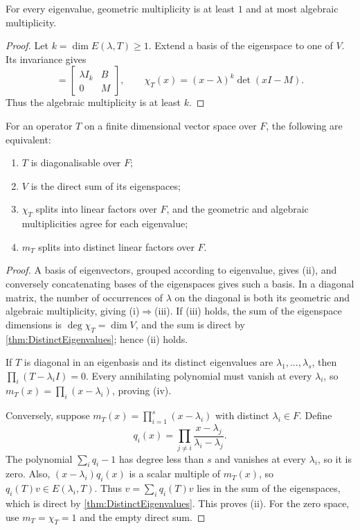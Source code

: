 \begin{Theorem}\label{thm:MultiplicityBound}
For every eigenvalue, geometric multiplicity is at least $1$ and at most algebraic multiplicity.
\end{Theorem}
\begin{proof}
Let $k=\dim E(\lambda,T)\ge1$. Extend a basis of the eigenspace to one of $V$. Its invariance gives
\begin{equation*}
[T]=\begin{bmatrix}\lambda I_k&B\\0&M\end{bmatrix},\qquad \chi_T(x)=(x-\lambda)^k\det(xI-M).
\end{equation*}
Thus the algebraic multiplicity is at least $k$.
\end{proof}

\begin{Theorem}\label{thm:DiagonalisationCriteria}
For an operator $T$ on a finite dimensional vector space over $F$, the following are equivalent:
\begin{enumerate}[label=(\roman*)]
\item $T$ is diagonalisable over $F$;
\item $V$ is the direct sum of its eigenspaces;
\item $\chi_T$ splits into linear factors over $F$, and the geometric and algebraic multiplicities agree for each eigenvalue;
\item $m_T$ splits into distinct linear factors over $F$.
\end{enumerate}
\end{Theorem}
\begin{proof}
A basis of eigenvectors, grouped according to eigenvalue, gives (ii), and conversely concatenating bases of the eigenspaces gives such a basis. In a diagonal matrix, the number of occurrences of $\lambda$ on the diagonal is both its geometric and algebraic multiplicity, giving (i)$\Rightarrow$(iii). If (iii) holds, the sum of the eigenspace dimensions is $\deg\chi_T=\dim V$, and the sum is direct by \cref{thm:DistinctEigenvalues}; hence (ii) holds.

If $T$ is diagonal in an eigenbasis and its distinct eigenvalues are $\lambda_1,\ldots,\lambda_s$, then $\prod_i(T-\lambda_i I)=0$. Every annihilating polynomial must vanish at every $\lambda_i$, so $m_T(x)=\prod_i(x-\lambda_i)$, proving (iv).

Conversely, suppose $m_T(x)=\prod_{i=1}^s(x-\lambda_i)$ with distinct $\lambda_i\in F$. Define
\begin{equation*}
q_i(x)=\prod_{j\ne i}\frac{x-\lambda_j}{\lambda_i-\lambda_j}.
\end{equation*}
The polynomial $\sum_iq_i-1$ has degree less than $s$ and vanishes at every $\lambda_i$, so it is zero. Also, $(x-\lambda_i)q_i(x)$ is a scalar multiple of $m_T(x)$, so $q_i(T)v\in E(\lambda_i,T)$. Thus $v=\sum_iq_i(T)v$ lies in the sum of the eigenspaces, which is direct by \cref{thm:DistinctEigenvalues}. This proves (ii). For the zero space, use $m_T=\chi_T=1$ and the empty direct sum.
\end{proof}

